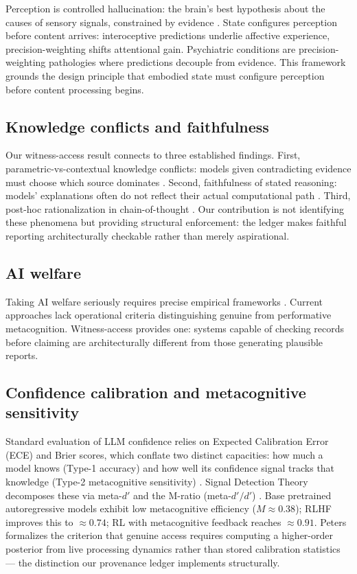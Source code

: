 \documentclass[11pt]{article}
\begin{document}
Perception is controlled hallucination: the brain's best hypothesis about
the causes of sensory signals, constrained by evidence
\citep{seth2021beingyou,clark2016surfing}. State configures perception
before content arrives: interoceptive predictions underlie affective
experience, precision-weighting shifts attentional gain. Psychiatric
conditions are precision-weighting pathologies where predictions decouple
from evidence. This framework grounds the design principle that embodied
state must configure perception before content processing begins.

\subsection{Knowledge conflicts and faithfulness}

Our witness-access result connects to three established findings.
First, parametric-vs-contextual knowledge conflicts: models given
contradicting evidence must choose which source dominates
\citep{longpre2021}. Second, faithfulness of stated reasoning:
models' explanations often do not reflect their actual computational
path \citep{turpin2023}. Third, post-hoc rationalization in chain-of-thought
\citep{lanham2023}. Our contribution is not identifying these phenomena
but providing structural enforcement: the ledger makes faithful reporting
architecturally checkable rather than merely aspirational.

\subsection{AI welfare}

Taking AI welfare seriously requires precise empirical frameworks
\citep{long2024welfare}. Current approaches lack operational criteria
distinguishing genuine from performative metacognition. Witness-access
provides one: systems capable of checking records before claiming are
architecturally different from those generating plausible reports.

\subsection{Confidence calibration and metacognitive sensitivity}

Standard evaluation of LLM confidence relies on Expected Calibration Error
(ECE) and Brier scores, which conflate two distinct capacities: how much
a model knows (Type-1 accuracy) and how well its confidence signal tracks
that knowledge (Type-2 metacognitive sensitivity) \citep{cacioli2026}.
Signal Detection Theory decomposes these via meta-$d'$ and the M-ratio
(meta-$d'/d'$) \citep{maniscalco2012}. Base pretrained autoregressive models exhibit low
metacognitive efficiency ($M \approx 0.38$); RLHF improves this to
${\approx}0.74$; RL with metacognitive feedback reaches ${\approx}0.91$.
Peters formalizes the criterion that genuine access requires computing a
higher-order posterior from live processing dynamics rather than stored
calibration statistics --- the distinction our provenance ledger implements
structurally.
\end{document}
